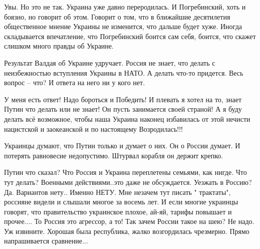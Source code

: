 Увы. Но это не так. Украина уже давно переродилась. И Погребинский, хоть и
боязно, но говорит об этом. Говорит о том, что в ближайшие десятилетия
общественное мнение Украины не изменится, что дальше будет хуже. Иногда
складывается впечатление, что Погребинский боится сам себя, боится, что скажет
слишком много правды об Украине. 

Результат Валдая об Украине удручает. Россия не знает, что делать с
неизбежностью вступления Украины в НАТО. А делать что-то придется. Весь вопрос
– что? И ответа на него ни у кого нет.

\begin{cmtfront}
\large
{}

У меня есть ответ! Надо бороться и Победить! И плевать я хотел на то, знает
Путин что делать или не знает! Он пусть занимается своей страной! А я буду
делать всё возможное, чтобы наша Украина наконец избавилась от этой нечисти
нацистской и заокеанской и по настоящему Возродилась!!!


Украинцы думают, что Путин только и думает о них. Он о России думает. И
потерять равновесие недопустимо. Штурвал корабля он держит крепко.


Путин что сказал? Что Россия и Украина переплетены семьями, как нигде. Что тут
делать? Военными действиями..это даже не обсуждается. Уезжать в Россию? Да.
Вариантов нету.. Именно НЕТУ. Мне незачем тут писать " трактаты", россияне
видели и слышали многое за восемь лет. И если многие украинцы говорят, что
правительство украинское плохое, ай-яй, тарифы повышает и прочее.... То Россия
это агрессор, а то!  Так зачем России такое на шею? Не надо. Уж извините.
Хорошая была республика, жалко возгордилась чрезмерно. Прямо напрашивается
сравнение...
	
\end{cmtfront}

